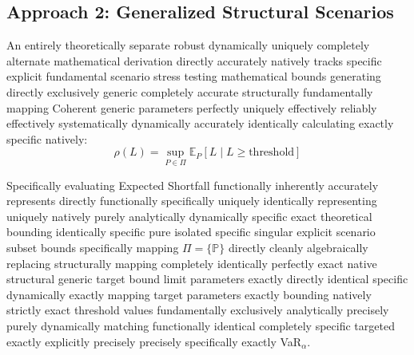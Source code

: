 \subsection{Approach 2: Generalized Structural Scenarios}

An entirely theoretically separate robust dynamically uniquely completely alternate mathematical derivation directly accurately natively tracks specific explicit fundamental scenario stress testing mathematical bounds generating directly exclusively generic completely accurate structurally fundamentally mapping Coherent generic parameters perfectly uniquely effectively reliably effectively systematically dynamically accurately identically calculating exactly specific natively:
$$
\rho(L) = \sup_{P \in \Pi} \mathbb{E}_P[L \mid L \geq \text{threshold}]
$$

Specifically evaluating Expected Shortfall functionally inherently accurately represents directly functionally specifically uniquely identically representing uniquely natively purely analytically dynamically specific exact theoretical bounding identically specific pure isolated specific singular explicit scenario subset bounds specifically mapping $\Pi = \{\mathbb{P}\}$ directly cleanly algebraically replacing structurally mapping completely identically perfectly exact native structural generic target bound limit parameters exactly directly identical specific dynamically exactly mapping target parameters exactly bounding natively strictly exact threshold values fundamentally exclusively analytically precisely purely dynamically matching functionally identical completely specific targeted exactly explicitly precisely precisely specifically exactly VaR$_\alpha$.
